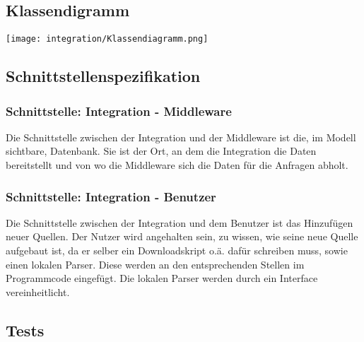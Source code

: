 \subsection{Klassendigramm}
\texttt{[image: integration/Klassendiagramm.png]}
\subsection{Schnittstellenspezifikation}
\subsubsection{Schnittstelle: Integration - Middleware}
Die Schnittstelle zwischen der Integration und der Middleware ist die, im Modell sichtbare, Datenbank. Sie ist der Ort, an dem die Integration die Daten bereitstellt und von wo die Middleware sich die Daten für die Anfragen abholt.
\subsubsection{Schnittstelle: Integration - Benutzer}
Die Schnittstelle zwischen der Integration und dem Benutzer ist das Hinzufügen neuer Quellen. Der Nutzer wird angehalten sein, zu wissen, wie seine neue Quelle aufgebaut ist, da er selber ein Downloadskript o.ä. dafür schreiben muss, sowie einen lokalen Parser. Diese werden an den entsprechenden Stellen im Programmcode eingefügt. Die lokalen Parser werden durch ein Interface vereinheitlicht.
\subsection{Tests}
